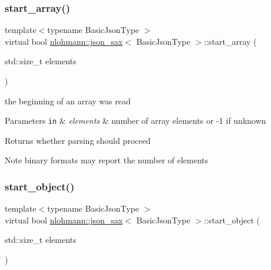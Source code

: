 \subsubsection{\texorpdfstring{start\+\_\+array()}{start\_array()}}
{\footnotesize\ttfamily template$<$typename Basic\+Json\+Type $>$ \\
virtual bool \hyperlink{structnlohmann_1_1json__sax}{nlohmann\+::json\+\_\+sax}$<$ Basic\+Json\+Type $>$\+::start\+\_\+array (\begin{DoxyParamCaption}\item[{std\+::size\+\_\+t}]{elements }\end{DoxyParamCaption})\hspace{0.3cm}{\ttfamily [pure virtual]}}



the beginning of an array was read 


\begin{DoxyParams}[1]{Parameters}
\mbox{\tt in}  & {\em elements} & number of array elements or -\/1 if unknown \\
\hline
\end{DoxyParams}
\begin{DoxyReturn}{Returns}
whether parsing should proceed 
\end{DoxyReturn}
\begin{DoxyNote}{Note}
binary formats may report the number of elements 
\end{DoxyNote}
\mbox{\label{structnlohmann_1_1json__sax_a0671528b0debb5a348169d61f0382a0f}} 
\subsubsection{\texorpdfstring{start\+\_\+object()}{start\_object()}}
{\footnotesize\ttfamily template$<$typename Basic\+Json\+Type $>$ \\
virtual bool \hyperlink{structnlohmann_1_1json__sax}{nlohmann\+::json\+\_\+sax}$<$ Basic\+Json\+Type $>$\+::start\+\_\+object (\begin{DoxyParamCaption}\item[{std\+::size\+\_\+t}]{elements }\end{DoxyParamCaption})\hspace{0.3cm}{\ttfamily [pure virtual]}}



